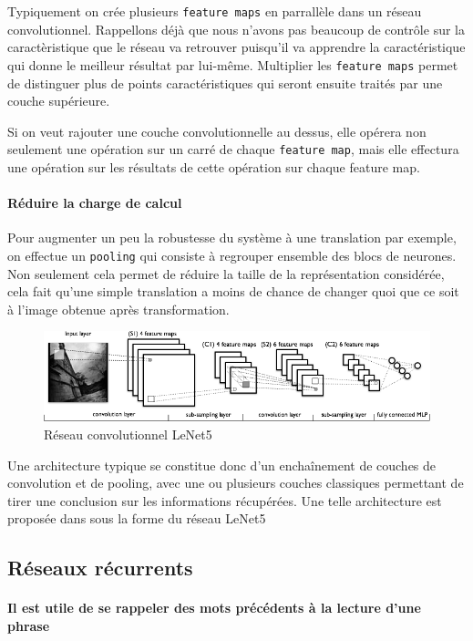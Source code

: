 \documentclass[a4paper, 11pt, onecolumn]{article}
\begin{document}
Typiquement on crée plusieurs \texttt{feature maps} en parrallèle dans un réseau
convolutionnel. Rappellons déjà que nous n'avons pas beaucoup de contrôle sur la
caractèristique que le réseau va retrouver puisqu'il va apprendre la
caractéristique qui donne le meilleur résultat par lui-même. Multiplier les
\texttt{feature maps} permet de distinguer plus de points caractéristiques qui
seront ensuite traités par une couche supérieure.

Si on veut rajouter une couche convolutionnelle au dessus, elle opérera non
seulement une opération sur un carré de chaque \texttt{feature map}, mais elle
effectura une opération sur les résultats de cette opération sur chaque feature
map.

\paragraph{Réduire la charge de calcul}

Pour augmenter un peu la robustesse du système à une translation par exemple, on
effectue un \texttt{pooling} qui consiste à regrouper ensemble des blocs de
neurones. Non seulement cela permet de réduire la taille de la représentation
considérée, cela fait qu'une simple translation a moins de chance de changer
quoi que ce soit à l'image obtenue après transformation.

\begin{figure}
  \centering
  \includegraphics[scale=0.8]{mylenet}
  \caption{Réseau convolutionnel LeNet5}
\end{figure}

Une architecture typique se constitue donc d'un enchaînement de couches de
convolution et de pooling, avec une ou plusieurs couches \og classiques\fg
permettant de tirer une conclusion sur les informations récupérées. Une telle
architecture est proposée dans \cite{lecun1998gradient} sous la forme du réseau LeNet5

\subsection{Réseaux récurrents}

\paragraph{Il est utile de se rappeler des mots précédents à la lecture d'une phrase}
\end{document}

